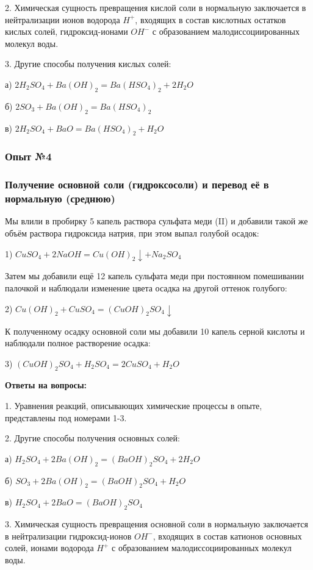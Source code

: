 \documentclass[12pt, a4paper]{article}
\begin{document}
	2. Химическая сущность превращения кислой соли в нормальную заключается в нейтрализации ионов водорода $H^{+}$, входящих в состав кислотных остатков кислых солей, гидроксид-ионами ${OH}^{-}$ с образованием малодиссоциированных молекул воды.
	
	3. Другие способы получения кислых солей:
	
	а) $2H_{2}SO_{4} + Ba(OH)_{2} = Ba(HSO_{4})_{2} + 2H_{2}O$
	
	б) $2SO_{3} + Ba(OH)_{2} = Ba(HSO_{4})_{2}$
	
	в) $2H_{2}SO_{4} + BaO = Ba(HSO_{4})_{2} + H_{2}O$
	
	\subsubsection*{Опыт №4}
	\subsubsection*{Получение основной соли (гидроксосоли) и перевод её в нормальную (среднюю)}
	
	Мы влили в пробирку 5 капель раствора сульфата меди (II) и добавили такой же объём раствора гидроксида натрия, при этом выпал голубой осадок:
	
	1) $CuSO_{4} + 2NaOH = Cu(OH)_{2} \downarrow + Na_{2}SO_{4}$ 
	
	Затем мы добавили ещё 12 капель сульфата меди при постоянном помешивании палочкой и наблюдали изменение цвета осадка на другой оттенок голубого:
	
	2) $Cu(OH)_{2} + CuSO_{4} = (CuOH)_{2}SO_{4} \downarrow$
	
	К полученному осадку основной соли мы добавили 10 капель серной кислоты и наблюдали полное растворение осадка:
	
	3) $(CuOH)_{2}SO_{4} + H_{2}SO_{4} = 2CuSO_{4} + H_{2}O$ 
	
	\textbf{Ответы на вопросы:}
	
	1. Уравнения реакций, описывающих химические процессы в опыте, представлены под номерами 1-3.
	
	2. Другие способы получения основных солей:
	
	а) $H_{2}SO_{4} + 2Ba(OH)_{2} = (BaOH)_{2}SO_{4} + 2H_{2}O$ 
	
	б) $SO_{3} + 2Ba(OH)_{2} = (BaOH)_{2}SO_{4} + H_{2}O$
	
	в) $H_{2}SO_{4} + 2BaO = (BaOH)_{2}SO_{4}$
	
	3. Химическая сущность превращения основной соли в нормальную заключается в нейтрализации гидроксид-ионов ${OH}^{-}$, входящих в состав катионов основных солей, ионами водорода $H^{+}$ с образованием малодиссоциированных молекул воды.
	
\end{document}
